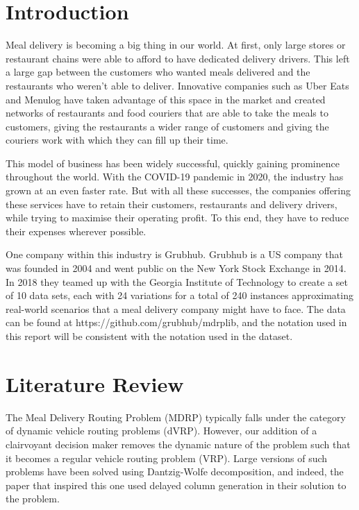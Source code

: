 \documentclass{article}
\begin{document}
\tableofcontents{}

\section{Introduction}

Meal delivery is becoming a big thing in our world. At first, only large stores or restaurant chains were able to afford to have dedicated delivery drivers. This left a large gap between the customers who wanted meals delivered and the restaurants who weren't able to deliver. Innovative companies such as Uber Eats and Menulog have taken advantage of this space in the market and created networks of restaurants and food couriers that are able to take the meals to customers, giving the restaurants a wider range of customers and giving the couriers work with which they can fill up their time.

This model of business has been widely successful, quickly gaining prominence throughout the world. With the COVID-19 pandemic in 2020, the industry has grown at an even faster rate. But with all these successes, the companies offering these services have to retain their customers, restaurants and delivery drivers, while trying to maximise their operating profit. To this end, they have to reduce their expenses wherever possible.

One company within this industry is Grubhub. Grubhub is a US company that was founded in 2004 and went public on the New York Stock Exchange in 2014. In 2018 they teamed up with the Georgia Institute of Technology to create a set of 10 data sets, each with 24 variations for a total of 240 instances approximating real-world scenarios that a meal delivery company might have to face. The data can be found at https://github.com/grubhub/mdrplib, and the notation used in this report will be consistent with the notation used in the dataset.

\section{Literature Review}

The Meal Delivery Routing Problem (MDRP) typically falls under the category of dynamic vehicle routing problems (dVRP). However, our addition of a clairvoyant decision maker removes the dynamic nature of the problem such that it becomes a regular vehicle routing problem (VRP). Large versions of such problems have been solved using Dantzig-Wolfe decomposition, and indeed, the paper that inspired this one used delayed column generation in their solution to the problem.
\end{document}
